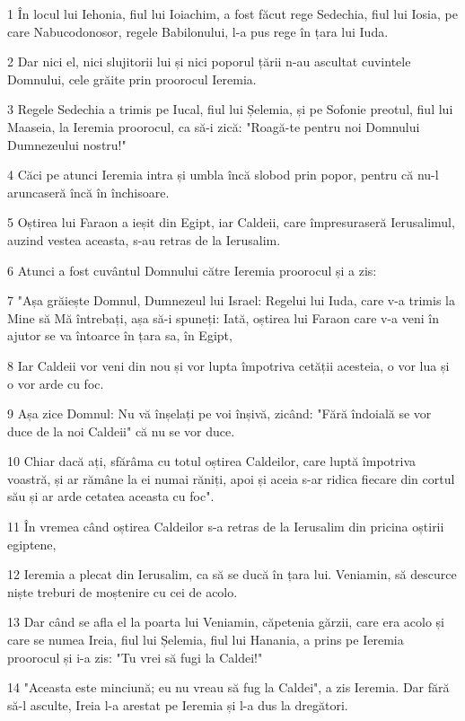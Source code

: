 \par 1 În locul lui Iehonia, fiul lui Ioiachim, a fost făcut rege Sedechia, fiul lui Iosia, pe care Nabucodonosor, regele Babilonului, l-a pus rege în țara lui Iuda.
\par 2 Dar nici el, nici slujitorii lui și nici poporul țării n-au ascultat cuvintele Domnului, cele grăite prin proorocul Ieremia.
\par 3 Regele Sedechia a trimis pe Iucal, fiul lui Șelemia, și pe Sofonie preotul, fiul lui Maaseia, la Ieremia proorocul, ca să-i zică: "Roagă-te pentru noi Domnului Dumnezeului nostru!"
\par 4 Căci pe atunci Ieremia intra și umbla încă slobod prin popor, pentru că nu-l aruncaseră încă în închisoare.
\par 5 Oștirea lui Faraon a ieșit din Egipt, iar Caldeii, care împresuraseră Ierusalimul, auzind vestea aceasta, s-au retras de la Ierusalim.
\par 6 Atunci a fost cuvântul Domnului către Ieremia proorocul și a zis:
\par 7 "Așa grăiește Domnul, Dumnezeul lui Israel: Regelui lui Iuda, care v-a trimis la Mine să Mă întrebați, așa să-i spuneți: Iată, oștirea lui Faraon care v-a veni în ajutor se va întoarce în țara sa, în Egipt,
\par 8 Iar Caldeii vor veni din nou și vor lupta împotriva cetății acesteia, o vor lua și o vor arde cu foc.
\par 9 Așa zice Domnul: Nu vă înșelați pe voi înșivă, zicând: "Fără îndoială se vor duce de la noi Caldeii" că nu se vor duce.
\par 10 Chiar dacă ați, sfărâma cu totul oștirea Caldeilor, care luptă împotriva voastră, și ar rămâne la ei numai răniți, apoi și aceia s-ar ridica fiecare din cortul său și ar arde cetatea aceasta cu foc".
\par 11 În vremea când oștirea Caldeilor s-a retras de la Ierusalim din pricina oștirii egiptene,
\par 12 Ieremia a plecat din Ierusalim, ca să se ducă în țara lui. Veniamin, să descurce niște treburi de moștenire cu cei de acolo.
\par 13 Dar când se afla el la poarta lui Veniamin, căpetenia gărzii, care era acolo și care se numea Ireia, fiul lui Șelemia, fiul lui Hanania, a prins pe Ieremia proorocul și i-a zis: "Tu vrei să fugi la Caldei!"
\par 14 "Aceasta este minciună; eu nu vreau să fug la Caldei", a zis Ieremia. Dar fără să-l asculte, Ireia l-a arestat pe Ieremia și l-a dus la dregători.
